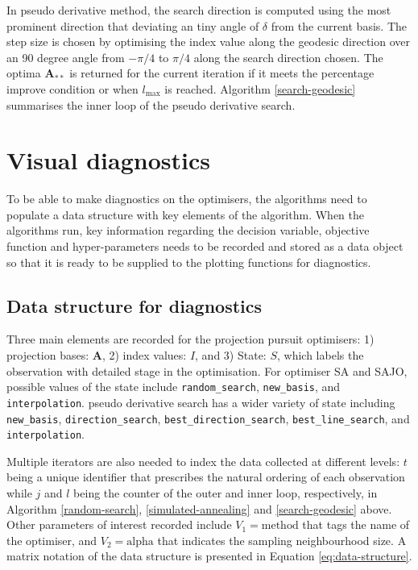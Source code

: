 In pseudo derivative \citep{cook1995grand} method, the search direction
is computed using the most prominent direction that deviating an tiny
angle of \(\delta\) from the current basis. The step size is chosen by
optimising the index value along the geodesic direction over an 90
degree angle from \(-\pi/4\) to \(\pi/4\) along the search direction
chosen. The optima \(\mathbf{A}_{**}\) is returned for the current
iteration if it meets the percentage improve condition or when
\(l_{\max}\) is reached. Algorithm \ref{search-geodesic} summarises the
inner loop of the pseudo derivative search.

\hypertarget{vis-diag}{%
\section{Visual diagnostics}\label{vis-diag}}

To be able to make diagnostics on the optimisers, the algorithms need to
populate a data structure with key elements of the algorithm. When the
algorithms run, key information regarding the decision variable,
objective function and hyper-parameters needs to be recorded and stored
as a data object so that it is ready to be supplied to the plotting
functions for diagnostics.

\hypertarget{data-structure-for-diagnostics}{%
\subsection{Data structure for
diagnostics}\label{data-structure-for-diagnostics}}

Three main elements are recorded for the projection pursuit optimisers:
1) projection bases: \(\mathbf{A}\), 2) index values: \(I\), and 3)
State: \(S\), which labels the observation with detailed stage in the
optimisation. For optimiser SA and SAJO, possible values of the state
include \texttt{random\_search}, \texttt{new\_basis}, and
\texttt{interpolation}. pseudo derivative search has a wider variety of
state including \texttt{new\_basis}, \texttt{direction\_search},
\texttt{best\_direction\_search}, \texttt{best\_line\_search}, and
\texttt{interpolation}.

Multiple iterators are also needed to index the data collected at
different levels: \(t\) being a unique identifier that prescribes the
natural ordering of each observation while \(j\) and \(l\) being the
counter of the outer and inner loop, respectively, in Algorithm
\ref{random-search}, \ref{simulated-annealing} and \ref{search-geodesic}
above. Other parameters of interest recorded include
\(V_1 = \text{method}\) that tags the name of the optimiser, and
\(V_2 = \text{alpha}\) that indicates the sampling neighbourhood size. A
matrix notation of the data structure is presented in Equation
\ref{eq:data-structure}.

